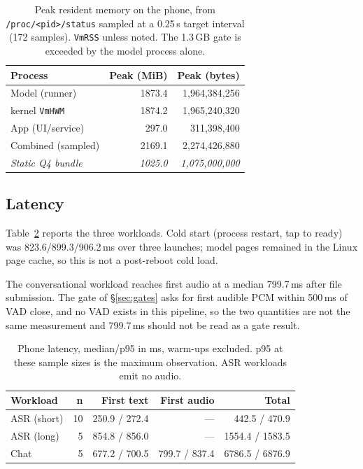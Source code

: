 \documentclass[10pt,twocolumn,letterpaper]{article}
\begin{document}
\begin{table}[t]
\centering
\footnotesize
\setlength{\tabcolsep}{4pt}
\caption{Peak resident memory on the phone, from \texttt{/proc/<pid>/status}
sampled at a 0.25\,s target interval (172 samples). \texttt{VmRSS} unless
noted. The 1.3\,GB gate is exceeded by the model process alone.}
\label{tab:phonemem}
\begin{tabular}{@{}lrr@{}}
\toprule
\textbf{Process} & \textbf{Peak (MiB)} & \textbf{Peak (bytes)} \\
\midrule
Model (runner) & 1873.4 & 1{,}964{,}384{,}256 \\
\quad kernel \texttt{VmHWM} & 1874.2 & 1{,}965{,}240{,}320 \\
App (UI/service) & 297.0 & 311{,}398{,}400 \\
Combined (sampled) & 2169.1 & 2{,}274{,}426{,}880 \\
\midrule
\textit{Static Q4 bundle} & \textit{1025.0} & \textit{1{,}075{,}000{,}000} \\
\bottomrule
\end{tabular}
\end{table}

\subsection{Latency}

Table~\ref{tab:phonelat} reports the three workloads. Cold start (process
restart, tap to ready) was 823.6/899.3/906.2\,ms over three launches; model
pages remained in the Linux page cache, so this is not a post-reboot cold
load.

The conversational workload reaches first audio at a median 799.7\,ms after
file submission. The gate of \S\ref{sec:gates} asks for first audible PCM
within 500\,ms of VAD close, and no VAD exists in this pipeline, so the two
quantities are not the same measurement and 799.7\,ms should not be read as a
gate result.

\begin{table}[t]
\centering
\footnotesize
\setlength{\tabcolsep}{3pt}
\caption{Phone latency, median/p95 in ms, warm-ups excluded. p95 at these
sample sizes is the maximum observation. ASR workloads emit no audio.}
\label{tab:phonelat}
\begin{tabular}{@{}lrrrr@{}}
\toprule
\textbf{Workload} & \textbf{n} & \textbf{First text} & \textbf{First audio} & \textbf{Total} \\
\midrule
ASR (short) & 10 & 250.9 / 272.4 & --- & 442.5 / 470.9 \\
ASR (long) & 5 & 854.8 / 856.0 & --- & 1554.4 / 1583.5 \\
Chat & 5 & 677.2 / 700.5 & 799.7 / 837.4 & 6786.5 / 6876.9 \\
\bottomrule
\end{tabular}
\end{table}
\end{document}
